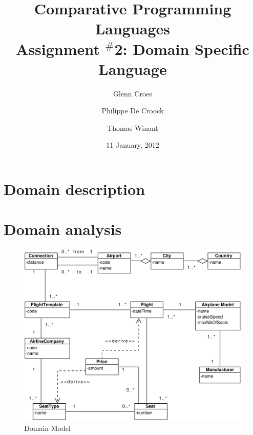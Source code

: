 \documentclass[a4paper]{article}
\begin{document}

\title{Comparative Programming Languages\\
Assignment $^{\#}$2: Domain Specific Language}
\author{Glenn Croes \and Philippe De Croock \and Thomas Winant}
\date{11 January, 2012}

\maketitle

\section{Domain description}
\label{sec:domain-description}



\section{Domain analysis}
\label{sec:domain-analysis}

\begin{figure}[ht!]
  \includegraphics[width=1.0\textwidth]{../analysis/domainModel.pdf}
  \caption{Domain Model}\label{fig:domain-model}
\end{figure}
\end{document}
